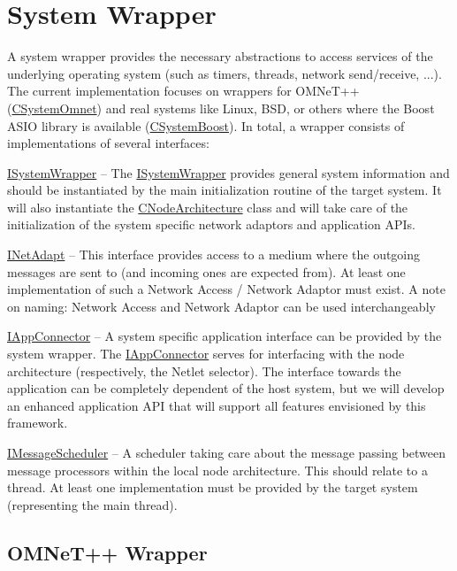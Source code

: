 \section{System Wrapper}
\label{ch:noanex:wrapper}

A system wrapper provides the necessary abstractions to access services of the underlying operating system (such as timers, threads, network send/receive, ...). The current implementation focuses on wrappers for OMNeT++ (\hyperlink{classCSystemOmnet}{CSystemOmnet}) and real systems like Linux, BSD, or others where the Boost ASIO library is available (\hyperlink{classCSystemBoost}{CSystemBoost}). In total, a wrapper consists of implementations of several interfaces:

\hyperlink{classISystemWrapper}{ISystemWrapper} -- The \hyperlink{classISystemWrapper}{ISystemWrapper} provides general system information and should be instantiated by the main initialization routine of the target system. It will also instantiate the \hyperlink{classCNodeArchitecture}{CNodeArchitecture} class and will take care of the initialization of the system specific network adaptors and application APIs.

\hyperlink{classINetAdapt}{INetAdapt} -- This interface provides access to a medium where the outgoing messages are sent to (and incoming ones are expected from). At least one implementation of such a Network Access / Network Adaptor must exist. A note on naming: Network Access and Network Adaptor can be used interchangeably

\hyperlink{classIAppConnector}{IAppConnector} -- A system specific application interface can be provided by the system wrapper. The \hyperlink{classIAppConnector}{IAppConnector} serves for interfacing with the node architecture (respectively, the Netlet selector). The interface towards the application can be completely dependent of the host system, but we will develop an enhanced application API that will support all features envisioned by this framework.

\hyperlink{classIMessageScheduler}{IMessageScheduler} -- A scheduler taking care about the message passing between message processors within the local node architecture. This should relate to a thread. At least one implementation must be provided by the target system (representing the main thread).


\subsection{OMNeT++ Wrapper}
\label{ch:noanex:wrapper:omnet}

